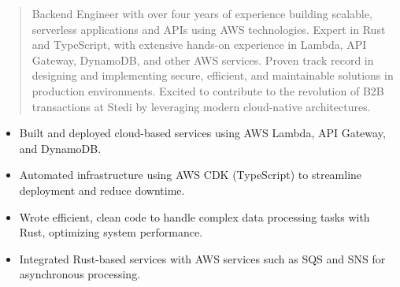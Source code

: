 




\makecvheader

\begin{quote}
  \noindent
  Backend Engineer with over four years of experience building scalable, serverless applications and APIs using AWS technologies. Expert in Rust and TypeScript, with extensive hands-on experience in Lambda, API Gateway, DynamoDB, and other AWS services. Proven track record in designing and implementing secure, efficient, and maintainable solutions in production environments. Excited to contribute to the revolution of B2B transactions at Stedi by leveraging modern cloud-native architectures.
\end{quote}

\par\smallskip
\noindent
\begin{minipage}{20cm}
  \begin{minipage}{9.75cm}
    \begin{itemize}
      \item Built and deployed cloud-based services using AWS Lambda, API Gateway, and DynamoDB.
      \item Automated infrastructure using AWS CDK (TypeScript) to streamline deployment and reduce downtime.
    \end{itemize}
  \end{minipage}
  \hfill
  \begin{minipage}{9.75cm}
    \begin{itemize}
      \item Wrote efficient, clean code to handle complex data processing tasks with Rust, optimizing system performance.
      \item Integrated Rust-based services with AWS services such as SQS and SNS for asynchronous processing.
    \end{itemize}
  \end{minipage}
\end{minipage}
\par\smallskip
\divider

